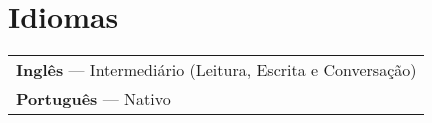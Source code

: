 \documentclass[a4paper,12pt]{article}
\begin{document}
\section{Idiomas}
\begin{tabularx}{\linewidth}{@{}X@{}}
\textbf{Inglês} — Intermediário (Leitura, Escrita e Conversação) \\
\textbf{Português} — Nativo \\
\end{tabularx}

\vfill
{}
\end{document}
